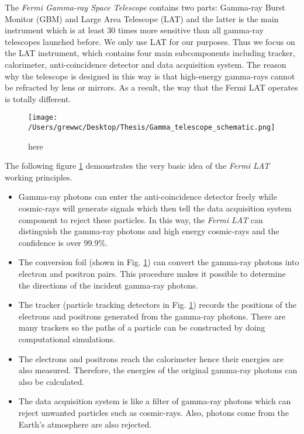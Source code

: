 \documentclass[12pt]{report}
\newcommand{\mycaption}[1]{\protect \caption{#1}}
\newcommand{\blackhref}[2]{
  \href{#1}{\color{black}{\textit{\small #2}}}
}
\begin{document}
        The \textit{Fermi Gamma-ray Space Telescope} contains two parts: Gamma-ray Burst Monitor (GBM) and Large 
        Area Telescope (LAT) and the latter is the main instrument which is at least 30 times more sensitive than 
        all gamma-ray telescopes launched before. We only use LAT for our purposes. Thus we 
        focus on the LAT instrument, which contains four main subcomponents including tracker, calorimeter,
        anti-coincidence detector and data acquisition system. The reason why the telescope is designed in 
        this way is that high-energy gamma-rays cannot be refracted by lens or mirrors. As a result, the way
        that the Fermi LAT operates is totally different. 

        \begin{figure}[!ht]  
          \centering
              \texttt{[image: /Users/grewwc/Desktop/Thesis/Gamma\_telescope\_schematic.png]}
              \caption{here}
              \label{fig:fermi schematic}
        \end{figure}
        The following figure \ref{fig:fermi schematic} demonstrates the very basic idea of the \textit{Fermi LAT}
        working principles. \\

        \begin{itemize}
          \item Gamma-ray photons can enter the anti-coincidence detector freely while cosmic-rays will generate
            signals which then tell the data acquisition system component to reject these particles. 
            In this way, the \textit{Fermi LAT} can distinguish the gamma-ray photons and high energy 
            cosmic-rays and the confidence is over 99.9\%. 
          \item The conversion foil (shown in Fig. \ref{fig:fermi schematic}) can convert the 
            gamma-ray photons into electron and positron pairs. This procedure makes it possible to determine 
            the directions of the incident gamma-ray photons. 
          \item The tracker (particle tracking detectors in Fig. \ref{fig:fermi schematic}) records the 
            positions of the electrons and positrons generated from the gamma-ray photons. There are many 
            trackers so the paths of a particle can be constructed by doing computational simulations.
          \item The electrons and positrons reach the calorimeter hence their energies are also measured.
            Therefore, the energies of the original gamma-ray photons can also be calculated. 
          \item The data acquisition system is like a filter of gamma-ray photons which can 
            reject unwanted particles such as cosmic-rays.
            Also, photons come from the Earth's atmosphere are also rejected. 
        \end{itemize}
\end{document}
